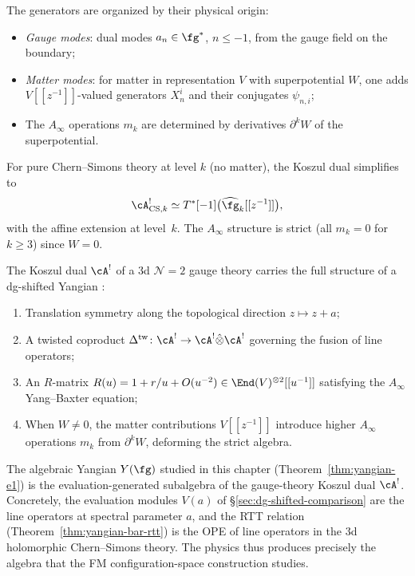 The generators are organized by their physical origin:
\begin{itemize}
\item \emph{Gauge modes}: dual modes $a_n \in \fg^*$, $n \leq -1$,
 from the gauge field on the boundary;
\item \emph{Matter modes}: for matter in representation $V$ with
 superpotential $W$, one adds $V[[z^{-1}]]$-valued generators $X_n^i$
 and their conjugates $\psi_{n,i}$;
\item The $A_\infty$ operations $m_k$ are determined by derivatives
 $\partial^k W$ of the superpotential.
\end{itemize}

\begin{example}
\label{ex:pure-cs-koszul-dual}
For pure Chern--Simons theory at level $k$ (no matter), the
Koszul dual simplifies to
\[
\cA^!_{\mathrm{CS},k}
\simeq T^*[-1]\bigl(\widehat{\fg}_k[[z^{-1}]]\bigr),
\]
with the affine extension at level~$k$. The $A_\infty$ structure is
strict (all $m_k = 0$ for $k \geq 3$) since $W = 0$.
\end{example}

\begin{theorem}
\label{thm:gauge-theory-yangian-structure}
The Koszul dual $\cA^!$ of a 3d $\mathcal{N}=2$ gauge theory carries
the full structure of a dg-shifted Yangian \cite{DNP25}:
\begin{enumerate}[label=\textup{(\roman*)}]
\item Translation symmetry along the topological direction
 $z \mapsto z + a$;
\item A twisted coproduct
 $\Delta^{\mathrm{tw}}\colon \cA^! \to \cA^! \hat\otimes \cA^!$
 governing the fusion of line operators;
\item An $R$-matrix
 $R(u) = 1 + r/u + O(u^{-2}) \in \End(V)^{\otimes 2}[[u^{-1}]]$
 satisfying the $A_\infty$ Yang--Baxter equation;
\item When $W \neq 0$, the matter contributions
 $V[[z^{-1}]]$ introduce higher $A_\infty$ operations
 $m_k$ from $\partial^k W$, deforming the strict algebra.
\end{enumerate}
\end{theorem}

\begin{remark}
\label{rem:gauge-theory-eval-subalgebra}
The algebraic Yangian $Y(\fg)$ studied in this chapter
(Theorem~\ref{thm:yangian-e1}) is the evaluation-generated
subalgebra of the gauge-theory Koszul dual $\cA^!$. Concretely, the
evaluation modules $V(a)$ of \S\ref{sec:dg-shifted-comparison} are
the line operators at spectral parameter $a$, and the RTT relation
(Theorem~\ref{thm:yangian-bar-rtt}) is the OPE of line operators in
the 3d holomorphic Chern--Simons theory. The physics thus produces
precisely the algebra that the FM configuration-space construction
studies.
\end{remark}


